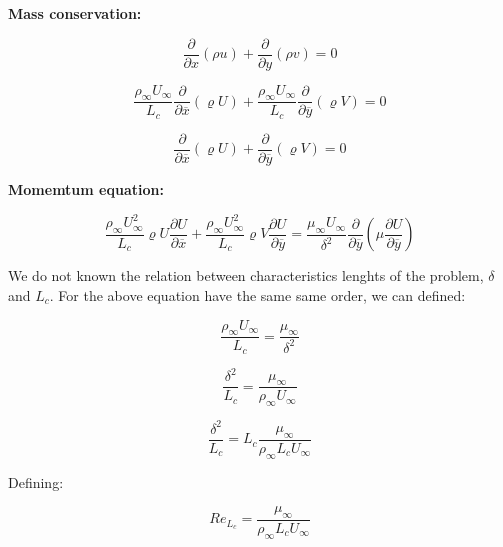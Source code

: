 \textbf{Mass conservation:}

\begin{equation} 
\frac{\partial}{\partial x}(\rho u)+
\frac{\partial}{\partial y}(\rho v)=0
\label{mass2}
\end{equation} 
  
  
\begin{equation} 
\frac{\rho_{\infty}U_{\infty}}{L_c}\frac{\partial}{\partial \overline{x}}(\varrho U)+
\frac{\rho_{\infty}U_{\infty}}{L_c}\frac{\partial}{\partial \overline{y}}(\varrho V)=0
\label{mass2}
\end{equation} 
  
  
\begin{equation} 
\frac{\partial}{\partial \overline{x}}(\varrho U)+
\frac{\partial}{\partial \overline{y}}(\varrho V)=0
\label{mass2}
\end{equation} 
  
  
\textbf{Momemtum equation:}
  
  
\begin{equation} 
\frac{\rho_{\infty}U_{\infty}^2}{L_c}\varrho U\frac{\partial U}{\partial \overline{x}}+
\frac{\rho_{\infty}U_{\infty}^2}{L_c}\varrho V\frac{\partial U}{\partial \overline{y}}=
\frac{\mu_{\infty}U_{\infty}}{\delta^2}\frac{\partial}{\partial \overline{y}}\left(\mu\frac{\partial U}{\partial  \overline{y}}\right)
\label{mnn}
\end{equation} 
  
  
We do not known the relation between characteristics lenghts  of  the problem, $\delta$ and $L_c$. 
For the above equation have the same same order, we can defined:
  
  
\begin{equation} 
\frac{\rho_{\infty}U_{\infty}}{L_c}=\frac{\mu_{\infty}}{\delta^2}
\end{equation} 
  
  
\begin{equation} 
\frac{\delta^2}{L_c}=\frac{\mu_{\infty}}{\rho_{\infty}U_{\infty}}
\end{equation} 
  
  
\begin{equation} 
\frac{\delta^2}{L_c}=L_c\frac{\mu_{\infty}}{\rho_{\infty}L_c U_{\infty}}
\end{equation} 
  
  
Defining:
  
  
\begin{equation} 
Re_{L_c}=\frac{\mu_{\infty}}{\rho_{\infty}L_c U_{\infty}}
\end{equation} 
  
